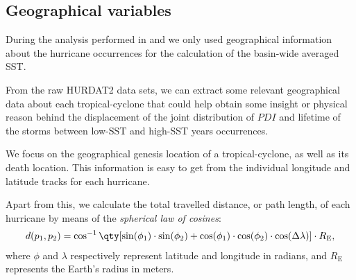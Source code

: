 

\subsection{Geographical variables}
During the analysis performed in  and  we only used geographical information about the hurricane occurrences for the calculation of the basin-wide averaged SST.

From the raw HURDAT2 data sets, we can extract some relevant geographical data about each tropical-cyclone that could help obtain some insight or physical reason behind the displacement of the joint distribution of $PDI$ and lifetime of the storms between low-SST and high-SST years occurrences.

\bigskip
We focus on the geographical genesis location of a tropical-cyclone, as well as its death location. This information is easy to get from the individual longitude and latitude tracks for each hurricane.

Apart from this, we calculate the total travelled distance, or path length, of each hurricane by means of the \emph{spherical law of cosines}:
\begin{align}
	d(p_{1}, p_{2}) = \cos^{-1}\qty[\sin(\phi_{1}) \cdot \sin(\phi_{2}) + \cos(\phi_{1}) \cdot \cos(\phi_{2}) \cdot \cos(\Delta \lambda)] \cdot R_{\text{E}},
\end{align}
where $\phi$ and $\lambda$ respectively represent latitude and longitude in radians, and $R_{\text{E}}$ represents the Earth's radius in meters.


